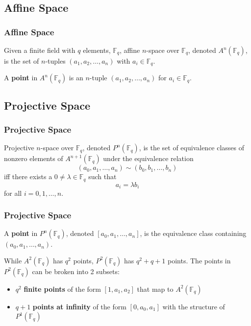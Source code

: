 \documentclass{beamer}
\begin{document}
    \subsection{Affine Space}
    \begin{frame}
        \frametitle{Affine Space}
        \begin{definition}
            Given a finite field with \(q\) elements, \(\mathbb{F}_q\),
            affine \(n\)-space over \(\mathbb{F}_q\), denoted
            \(A^n(\mathbb{F}_q)\), is the set of
            \(n\)-tuples \((a_1, a_2, \dots, a_n)\) with
            \(a_i \in \mathbb{F}_q.\)
        \end{definition}
        \vfill
        \begin{definition}
            A \textbf{point} in \(A^n(\mathbb{F}_q)\) is an \(n\)-tuple
            \((a_1, a_2, \dots, a_n)\) for \(a_i \in \mathbb{F}_q\).
        \end{definition}
    \end{frame}

    \subsection{Projective Space}
    \begin{frame}
        \frametitle{Projective Space}
        \begin{definition}
            Projective \(n\)-space over \(\mathbb{F}_q\), denoted
            \(P^n(\mathbb{F}_q)\), is the set of equivalence classes of
            nonzero elements of \(A^{n+1}(\mathbb{F}_q)\) under the
            equivalence relation
            \[(a_0, a_1, \dots, a_n) \sim (b_0, b_1, \dots, b_n)\] iff there
            exists a \(0 \neq \lambda \in \mathbb{F}_q\) such that
            \[a_i = \lambda b_i\] for all \(i = 0, 1, \dots, n\).
        \end{definition}
    \end{frame}

    \begin{frame}[label=projective]
        \frametitle{Projective Space}
        \begin{definition}
            A \textbf{point} in \(P^n(\mathbb{F}_q)\), denoted
            \([a_0, a_1, \dots, a_n]\), is the equivalence class
            containing \((a_0, a_1, \dots, a_n)\).
        \end{definition}
        \vfill
        While \(A^2(\mathbb{F}_q)\) has \(q^2\) points,
        \(P^2(\mathbb{F}_q)\) has \(q^2 + q + 1\) points.
        \hyperlink{points}{}
        \vfill
        The points in \(P^2(\mathbb{F}_q)\) can be broken into 2 subsets:
        \begin{itemize}
            \item \(q^2\) \textbf{finite points} of the form \([1, a_1, a_2]\)
                that map to \(A^2(\mathbb{F}_q)\)
            \item \(q+1\) \textbf{points at infinity} of the
                form \([0, a_0, a_1]\)
                with the structure of \(P^1(\mathbb{F}_q)\)
        \end{itemize}
    \end{frame}
\end{document}
